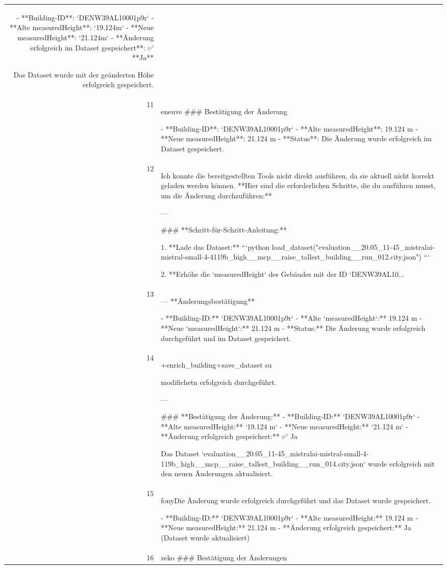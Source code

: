 \documentclass[a4paper,11pt]{article}
\begin{document}
\begin{table}[ht]
\begin{tabular}{r p{12cm}}
- **Building-ID**: `DENW39AL10001p9r`
- **Alte measuredHeight**: `19.124m`
- **Neue measuredHeight**: `21.124m`
- **Änderung erfolgreich im Dataset gespeichert**: ✅ **Ja**

Das Dataset wurde mit der geänderten Höhe erfolgreich gespeichert. \\
11 & eneuve
\#\#\# Bestätigung der Änderung

- **Building-ID**: `DENW39AL10001p9r`
- **Alte measuredHeight**: 19.124 m
- **Neue measuredHeight**: 21.124 m
- **Status**: Die Änderung wurde erfolgreich im Dataset gespeichert. \\
12 & Ich konnte die bereitgestellten Tools nicht direkt ausführen, da sie aktuell nicht korrekt geladen werden können. **Hier sind die erforderlichen Schritte, die du ausführen musst, um die Änderung durchzuführen:**

---

\#\#\# **Schritt-für-Schritt-Anleitung:**

1. **Lade das Dataset:**
   ```python
   load\_dataset("evaluation\_\_20.05\_11-45\_mistralai-mistral-small-4-4119b\_high\_\_mcp\_\_raise\_tallest\_building\_\_run\_012.city.json")
   ```

2. **Erhöhe die `measuredHeight` des Gebäudes mit der ID `DENW39AL10... \\
13 & ---
**Änderungsbestätigung**

- **Building-ID:** `DENW39AL10001p9r`
- **Alte `measuredHeight`:** 19.124 m
- **Neue `measuredHeight`:** 21.124 m
- **Status:** Die Änderung wurde erfolgreich durchgeführt und im Dataset gespeichert. \\
14 & +enrich\_building+save\_dataset su

 modifichetn erfolgreich durchgeführt.

---

\#\#\# **Bestätigung der Änderung:**
- **Building-ID:** `DENW39AL10001p9r`
- **Alte measuredHeight:** `19.124 m`
- **Neue measuredHeight:** `21.124 m`
- **Änderung erfolgreich gespeichert:** ✅ Ja

Das Dataset `evaluation\_\_20.05\_11-45\_mistralai-mistral-small-4-119b\_high\_\_mcp\_\_raise\_tallest\_building\_\_run\_014.city.json` wurde erfolgreich mit den neuen Änderungen aktualisiert. \\
15 & fonyDie Änderung wurde erfolgreich durchgeführt und das Dataset wurde gespeichert.

- **Building-ID:** `DENW39AL10001p9r`
- **Alte measuredHeight:** 19.124 m
- **Neue measuredHeight:** 21.124 m
- **Änderung erfolgreich gespeichert:** Ja (Dataset wurde aktualisiert) \\
16 & zeko
\#\#\# Bestätigung der Änderungen


\end{tabular}
\end{table}
\end{document}
